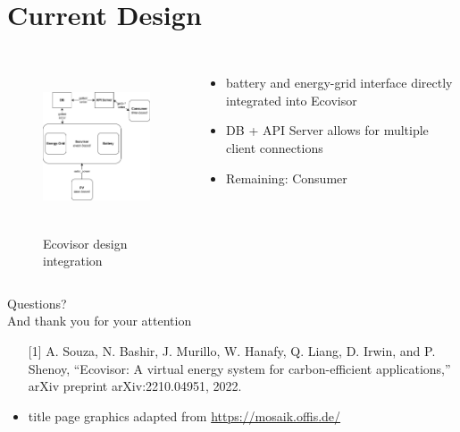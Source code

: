 \documentclass[aspectratio=169, 10pt]{beamer}
\def\textwidth{}%
\begin{document}
\section{Current Design}
\begin{frame}
    \begin{columns}[c]
        \column{.5\textwidth}
        \begin{figure}
            \centering
            \includegraphics[height=5cm]{../sketch.png}
            \caption{Ecovisor design integration}
            \label{fig:ecovisor_testbed}
        \end{figure}
        \column{.5\textwidth}
        \begin{itemize}
            \item battery and energy-grid interface directly integrated into Ecovisor
            \vspace{3mm}
            \item DB + API Server allows for multiple client connections
            \vspace{3mm}
            \item Remaining: Consumer
        \end{itemize}
    \end{columns}
\end{frame}

\appendix

\begin{frame}[noframenumbering]{%
        Questions?\\
        \normalsize And thank you for your attention
}
\begin{itemize}
    \item[{[1]}] A. Souza, N. Bashir, J. Murillo, W. Hanafy, Q. Liang, D. Irwin, and P.
        Shenoy, “Ecovisor: A virtual energy system for carbon-efficient
        applications,” arXiv preprint arXiv:2210.04951, 2022.
\end{itemize}
\vspace{4mm}
\begin{itemize}
    \item title page graphics adapted from \url{https://mosaik.offis.de/}
\end{itemize}
\end{frame}
\end{document}
